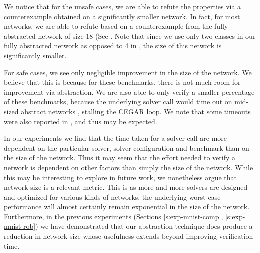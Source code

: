 We notice that for the unsafe cases, we are able to refute the
properties via a counterexample obtained on a significantly smaller network. In
fact, for most networks, we are able to refute based on a counterexample from
the fully abstracted network of size $18$ (See . Note that since we use only two classes in our
fully abstracted network as opposed to 4 in \cite{cegar-nn}, the size of this
network is significantly smaller. 

For safe cases, we see only negligible improvement in the size of the network.
We believe that this is because for these benchmarks, there is not much room for
improvement via abstraction. We are also able to only verify a smaller
percentage of these benchmarks, because the underlying solver call would time
out on mid-sized abstract networks , stalling
the CEGAR loop. We note that some timeouts were also reported in
\cite{cegar-nn}, and thus may be expected. 

In our experiments we find that the time taken for a solver call are more
dependent on the particular solver, solver configuration and benchmark than on
the size of the network. Thus it may seem that the effort needed to verify a
network is dependent on other factors than simply the size of the network. While
this may be interesting to explore in future work, we nonetheless argue that
network size is a relevant metric. This is as more and more solvers are designed
and optimized for various kinds of networks, the underlying worst case
performance will almost certainly remain exponential in the size of the network.
Furthermore, in the previous experiments (Sections \ref{s:exp-mnist-comp},
\ref{s:exp-mnist-rob}) we have demonstrated that our abstraction technique does
produce a reduction in network size whose usefulness extends beyond improving
verification time. 

